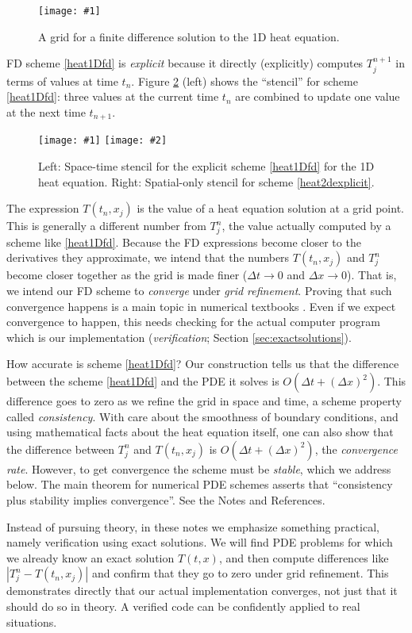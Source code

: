 \documentclass[letterpaper,final,12pt,reqno]{amsart}
\newcommand{\onefigsize}[3]{
\begin{figure}[ht]
\centering
\texttt{[image: \#1]}
\caption{#2}
\label{fig:#1}
\end{figure}}
\newcommand{\twofigsizes}[5]{
\begin{figure}[ht]
\centering
\texttt{[image: \#1]} \quad
\texttt{[image: \#2]}
\caption{#3}
\label{fig:#1}
\end{figure}}
\begin{document}
\onefigsize{timespacegrid}{A grid for a finite difference solution to the 1D heat equation.}{2.0in}

FD scheme \eqref{heat1Dfd} is \emph{explicit} because it directly (explicitly) computes $T_j^{n+1}$ in terms of values at time $t_n$.  Figure \ref{fig:expstencil} (left) shows the ``stencil'' for scheme \eqref{heat1Dfd}: three values at the current time $t_n$ are combined to update one value at the next time $t_{n+1}$.

\twofigsizes{expstencil}{exp2dstencil}{Left: Space-time stencil for the explicit scheme \eqref{heat1Dfd} for the 1D heat equation.  Right: Spatial-only stencil for scheme \eqref{heat2dexplicit}.}{2.0in}{2.1in}

The expression $T(t_n,x_j)$ is the value of a heat equation solution at a grid point.  This is generally a different number from $T_j^n$, the value actually computed by a scheme like \eqref{heat1Dfd}.  Because the FD expressions become closer to the derivatives they approximate, we intend that the numbers $T(t_n,x_j)$ and $T_j^n$ become closer together as the grid is made finer ($\Delta t \to 0$ and $\Delta x \to 0$).  That is, we intend our FD scheme to \emph{converge} under \emph{grid refinement}.  Proving that such convergence happens is a main topic in numerical textbooks \cite{LeVequeFD,MortonMayers}.  Even if we expect convergence to happen, this needs checking for the actual computer program which is our implementation (\emph{verification}; Section \ref{sec:exactsolutions}).

How accurate is scheme \eqref{heat1Dfd}?  Our construction tells us that the difference between the scheme \eqref{heat1Dfd} and the PDE it solves is $O(\Delta t + (\Delta x)^2)$.  This difference goes to zero as we refine the grid in space and time, a scheme property called \emph{consistency}.  With care about the smoothness of boundary conditions, and using mathematical facts about the heat equation itself, one can also show that the difference between $T_j^n$ and $T(t_n,x_j)$ is $O(\Delta t + (\Delta x)^2)$, the \emph{convergence rate}.  However, to get convergence the scheme must be \emph{stable}, which we address below.  The main theorem for numerical PDE schemes asserts that ``consistency plus stability implies convergence''.  See the Notes and References.

Instead of pursuing theory, in these notes we emphasize something practical, namely verification using exact solutions.  We will find PDE problems for which we already know an exact solution $T(t,x)$, and then compute differences like $|T_j^n - T(t_n,x_j)|$ and confirm that they go to zero under grid refinement.  This demonstrates directly that our actual implementation converges, not just that it should do so in theory.  A verified code can be confidently applied to real situations.
\end{document}

